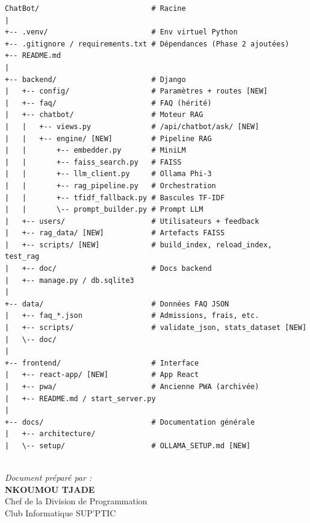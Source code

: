 \documentclass[11pt,a4paper]{article}
\begin{document}
\vspace{0.3cm}
\begin{lstlisting}[basicstyle=\ttfamily\small, caption=Arborescence Phase 2, breaklines=true]
ChatBot/                          # Racine
|
+-- .venv/                        # Env virtuel Python
+-- .gitignore / requirements.txt # Dépendances (Phase 2 ajoutées)
+-- README.md
|
+-- backend/                      # Django
|   +-- config/                   # Paramètres + routes [NEW]
|   +-- faq/                      # FAQ (hérité)
|   +-- chatbot/                  # Moteur RAG
|   |   +-- views.py              # /api/chatbot/ask/ [NEW]
|   |   +-- engine/ [NEW]         # Pipeline RAG
|   |       +-- embedder.py       # MiniLM
|   |       +-- faiss_search.py   # FAISS
|   |       +-- llm_client.py     # Ollama Phi-3
|   |       +-- rag_pipeline.py   # Orchestration
|   |       +-- tfidf_fallback.py # Bascules TF-IDF
|   |       \-- prompt_builder.py # Prompt LLM
|   +-- users/                    # Utilisateurs + feedback
|   +-- rag_data/ [NEW]           # Artefacts FAISS
|   +-- scripts/ [NEW]            # build_index, reload_index, test_rag
|   +-- doc/                      # Docs backend
|   +-- manage.py / db.sqlite3
|
+-- data/                         # Données FAQ JSON
|   +-- faq_*.json                # Admissions, frais, etc.
|   +-- scripts/                  # validate_json, stats_dataset [NEW]
|   \-- doc/
|
+-- frontend/                     # Interface
|   +-- react-app/ [NEW]          # App React
|   +-- pwa/                      # Ancienne PWA (archivée)
|   +-- README.md / start_server.py
|
+-- docs/                         # Documentation générale
|   +-- architecture/
|   \-- setup/                    # OLLAMA_SETUP.md [NEW]
                             
\end{lstlisting}



\vfill

\begin{center}
\textit{Document préparé par :} \\
\textbf{NKOUMOU TJADE} \\
Chef de la Division de Programmation \\
Club Informatique SUP'PTIC

\end{center}
\end{document}

